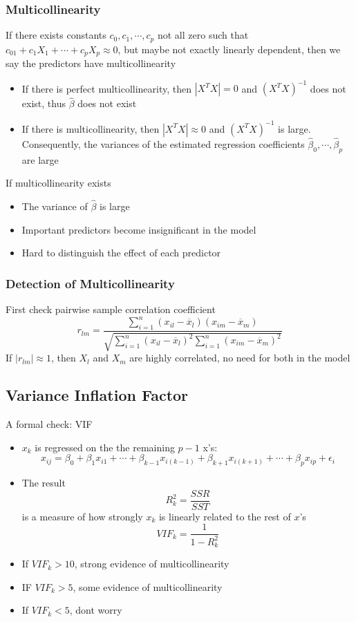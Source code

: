 \documentclass[11pt]{article}
\begin{document}
\subsubsection{Multicollinearity}
If there exists constants $c_0,c_1,\cdots,c_p$ not all zero such that $c_01+c_1X_1+\cdots+c_pX_p\approx0$, 
but maybe not exactly linearly dependent, then we say the predictors have multicollinearity
\begin{itemize}
    \item If there is perfect multicollinearity, then $|X^TX|=0$ and $(X^TX)^{-1}$ does not exist, thus $\hat\beta$ does not exist 
    \item If there is multicollinearity, then $|X^TX|\approx 0$ and $(X^TX)^{-1}$ is large. Consequently, the variances of the estimated regression coefficients $\hat\beta_0,\cdots,\hat\beta_p$ are large
\end{itemize}
If multicollinearity exists 
\begin{itemize}
    \item The variance of $\hat\beta$ is large 
    \item Important predictors become insignificant in the model 
    \item Hard to distinguish the effect of each predictor
\end{itemize}
\subsubsection{Detection of Multicollinearity}
First check pairwise sample correlation coefficient 
\[r_{lm} = \frac{\sum_{i=1}^{n}(x_{il}-\overline{x}_l)(x_{im}-\overline{x}_m)}{\sqrt{\sum_{i=1}^{n}(x_{il}-\overline{x}_l)^2\sum_{i=1}^{n}(x_{im}-\overline{x}_m)^2}}\]
If $|r_{lm}|\approx 1$, then $X_l$ and $X_m$ are highly correlated, no need for both in the model 
\subsection{Variance Inflation Factor}
A formal check: VIF
\begin{itemize}
    \item $x_k$ is regressed on the the remaining $p-1$ x's:
    \[x_{ij} = \beta_0+\beta_1x_{i1}+\cdots+\beta_{k-1}x_{i(k-1)}+\beta_{k+1}x_{i(k+1)}+\cdots+\beta_px_{ip}+\epsilon_i\]
    \item The result 
    \[R^2_k = \frac{SSR}{SST}\]
    is a measure of how strongly $x_k$ is linearly related to the rest of $x$'s 
    \[VIF_k = \frac{1}{1-R^2_k}\]
    \item If $VIF_k>10$, strong evidence of multicollinearity
    \item IF $VIF_k>5$, some evidence of multicollinearity
    \item If $VIF_k<5$, dont worry 
\end{itemize}
\end{document}
